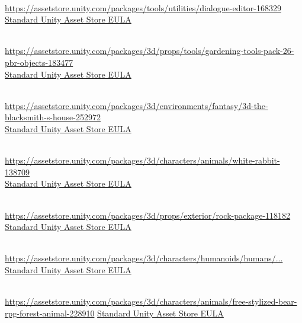 \begin{description}[]
\item[Dialogue Editor] \hfill \\ \url{https://assetstore.unity.com/packages/tools/utilities/dialogue-editor-168329} \\
  \href{https://unity.com/legal/as-terms}{Standard Unity Asset Store EULA}

\item[Gardening Tools Pack - 26 PBR objects] \hfill \\ \url{https://assetstore.unity.com/packages/3d/props/tools/gardening-tools-pack-26-pbr-objects-183477} \\
  \href{https://unity.com/legal/as-terms}{Standard Unity Asset Store EULA}

\item[3D The Blacksmith's House] \hfill \\ \url{https://assetstore.unity.com/packages/3d/environments/fantasy/3d-the-blacksmith-s-house-252972} \\
  \href{https://unity.com/legal/as-terms}{Standard Unity Asset Store EULA}

\item[White Rabbit] \hfill \\ \url{https://assetstore.unity.com/packages/3d/characters/animals/white-rabbit-138709} \\
  \href{https://unity.com/legal/as-terms}{Standard Unity Asset Store EULA}

\item[Rock package] \hfill \\ \url{https://assetstore.unity.com/packages/3d/props/exterior/rock-package-118182} \\
  \href{https://unity.com/legal/as-terms}{Standard Unity Asset Store EULA}

\item[FREE - Modular Character - Fantasy RPG Human Male] \hfill \\ \href{https://assetstore.unity.com/packages/3d/characters/humanoids/humans/free-modular-character-fantasy-rpg-human-male-228952}{https://assetstore.unity.com/packages/3d/characters/humanoids/humans/...} \\
  \href{https://unity.com/legal/as-terms}{Standard Unity Asset Store EULA}

\item[FREE Stylized Bear - RPG Forest Animal] \hfill \\ \url{https://assetstore.unity.com/packages/3d/characters/animals/free-stylized-bear-rpg-forest-animal-228910}
  \href{https://unity.com/legal/as-terms}{Standard Unity Asset Store EULA}


\end{description}
